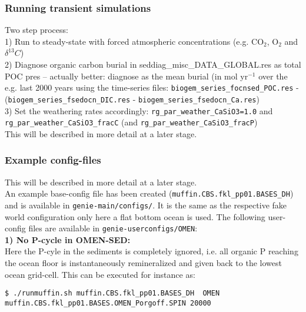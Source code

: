 %
\subsubsection*{Running transient simulations}
Two step process:\\
1) Run to steady-state with forced atmospheric concentrations (e.g. CO$_2$, O$_2$ and \(\delta^{13}C\))\\
2) Diagnose organic carbon burial in seddiag\_misc\_DATA\_GLOBAL.res as total POC pres -- actually better: diagnose as the mean burial (in mol yr$^{-1}$ over the e.g. last 2000 years using the time-series files:
 \texttt{biogem\_series\_focnsed\_POC.res} - (\texttt{biogem\_series\_fsedocn\_DIC.res} - \texttt{biogem\_series\_fsedocn\_Ca.res})\\
3) Set the weathering rates accordingly: \texttt{rg\_par\_weather\_CaSiO3=1.0} and \texttt{rg\_par\_weather\_CaSiO3\_fracC} (and \texttt{rg\_par\_weather\_CaSiO3\_fracP})\\
This will be described in more detail at a later stage.

%
\subsubsection*{Example config-files}
This will be described in more detail at a later stage.\\
An example base-config file has been created (\texttt{muffin.CBS.fkl\_pp01.BASES\_DH}) and is available in \texttt{genie-main/configs/}. It is the same as the respective fake world configuration only here a flat bottom ocean is used. The following
user-config files are available in \texttt{genie-userconfigs/OMEN}:\\

\vspace{1mm}
\noindent
\textbf{1) No P-cycle in OMEN-SED:}\\
Here the P-cyle in the sediments is completely ignored, i.e. all organic P reaching the ocean floor is instantaneously remineralized and given back to the lowest ocean grid-cell. This can be executed for instance as:
\vspace{-1mm}
\begin{verbatim}
$ ./runmuffin.sh muffin.CBS.fkl_pp01.BASES_DH  OMEN
muffin.CBS.fkl_pp01.BASES.OMEN_Porgoff.SPIN 20000
\end{verbatim}
\vspace{-1mm}

